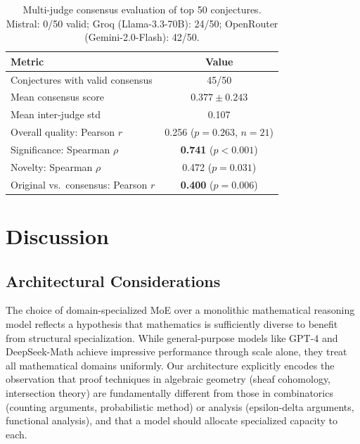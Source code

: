 \documentclass[11pt,a4paper]{article}
\begin{document}
\begin{table}[h]
\centering
\caption{Multi-judge consensus evaluation of top 50 conjectures. Mistral: 0/50 valid; Groq (Llama-3.3-70B): 24/50; OpenRouter (Gemini-2.0-Flash): 42/50.}
\label{tab:multi_judge}
\small
\begin{tabular}{@{}lc@{}}
\toprule
\textbf{Metric} & \textbf{Value} \\
\midrule
Conjectures with valid consensus  & 45/50 \\
Mean consensus score               & $0.377 \pm 0.243$ \\
Mean inter-judge std               & 0.107 \\
Overall quality: Pearson $r$       & 0.256 ($p = 0.263$, $n{=}21$) \\
Significance: Spearman $\rho$      & \textbf{0.741} ($p < 0.001$) \\
Novelty: Spearman $\rho$           & 0.472 ($p = 0.031$) \\
Original vs.\ consensus: Pearson $r$ & \textbf{0.400} ($p = 0.006$) \\
\bottomrule
\end{tabular}
\end{table}


\section{Discussion}
\label{sec:discussion}

\subsection{Architectural Considerations}

The choice of domain-specialized MoE over a monolithic mathematical reasoning model reflects a hypothesis that mathematics is sufficiently diverse to benefit from structural specialization. While general-purpose models like GPT-4 \citep{achiam2024gpt4} and DeepSeek-Math \citep{shao2024deepseekmath} achieve impressive performance through scale alone, they treat all mathematical domains uniformly. Our architecture explicitly encodes the observation that proof techniques in algebraic geometry (sheaf cohomology, intersection theory) are fundamentally different from those in combinatorics (counting arguments, probabilistic method) or analysis (epsilon-delta arguments, functional analysis), and that a model should allocate specialized capacity to each.
\end{document}
